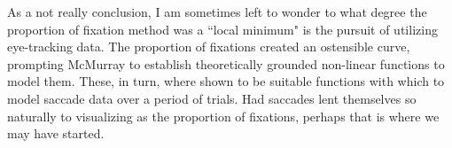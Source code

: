 \documentclass{article}
\begin{document}
As a not really conclusion, I am sometimes left to wonder to what degree the proportion of fixation method was a  ``local minimum" is the pursuit of utilizing eye-tracking data. The proportion of fixations created an ostensible curve, prompting McMurray to establish theoretically grounded non-linear functions to model them. These, in turn, where shown to be suitable functions with which to model saccade data over a period of trials. Had saccades lent themselves so naturally to visualizing as the proportion of fixations, perhaps that is where we may have started.
\end{document}
